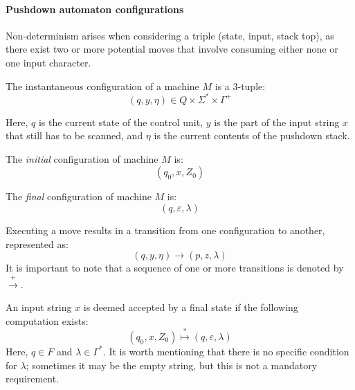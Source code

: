 \paragraph*{Pushdown automaton configurations}
Non-determinism arises when considering a triple (state, input, stack top), as there exist two or more potential moves that involve consuming either none or one input character.
\begin{definition}
    The instantaneous configuration of a machine $M$ is a 3-tuple: 
    \[(q,y,\eta)\in Q \times \Sigma^{*} \times \Gamma^{+}\]
\end{definition}
Here, $q$ is the current state of the control unit, $y$ is the part of the input string $x$ that still has to be scanned, and $\eta$ is the current contents of the pushdown stack.
\begin{definition}
    The \emph{initial} configuration of machine $M$ is: 
    \[(q_0,x,Z_0)\]
\end{definition}
\begin{definition}
    The \emph{final} configuration of machine $M$ is: 
    \[(q,\varepsilon,\lambda)\]
\end{definition}

Executing a move results in a transition from one configuration to another, represented as:
\[(q,y,\eta)\rightarrow(p,z,\lambda)\]
It is important to note that a sequence of one or more transitions is denoted by $\overset{+}{\rightarrow}$. 

An input string $x$ is deemed accepted by a final state if the following computation exists:
\[(q_0,x,Z_0)\overset{*}{\mapsto}(q,\varepsilon,\lambda)\]
Here, $q \in F$ and $\lambda\in\Gamma^{*}$. 
It is worth mentioning that there is no specific condition for $\lambda$; sometimes it may be the empty string, but this is not a mandatory requirement.


